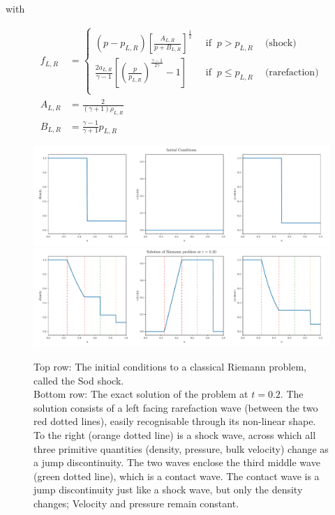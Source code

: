 with 

\begin{align}
	f_{L,R} &= 
		\begin{cases}
			(p - p_{L,R}) \left[ \frac{A_{L,R}}{p + B_{L,R}} \right]^{\frac{1}{2}}
				& ~\text{ if } ~ p > p_{L,R} ~ \quad \text{(shock)} \\
			\frac{2 a_{L,R}}{\gamma - 1} \left[ \left( \frac{p}{p_{L,R}} \right)^ \frac{\gamma -1}{2 \gamma} - 1 \right]
				& ~\text{ if } ~ p \leq p_{L,R} ~ \quad \text{(rarefaction)} \label{eq:riemann-pstar}\\
		\end{cases} \\
	A_{L,R} &= 
		\frac{2}{(\gamma + 1) \rho_{L,R}}\\
	B_{L,R} &= 
		\frac{\gamma - 1}{\gamma + 1} p_{L,R}
\end{align}












\begin{figure}
	\centering
	\includegraphics[width=.9\textwidth]{./figures/riemann_IC.pdf}%
	\\
	\includegraphics[width=.9\textwidth]{./figures/riemann_exact_solution.pdf}%
	\caption{
		Top row: The initial conditions to a classical Riemann problem, called the Sod shock.\\
%
		Bottom row: The exact solution of the problem at $t = 0.2$.
		The solution consists of a left facing rarefaction wave (between the two red dotted lines), easily recognisable through its non-linear shape.
		To the right (orange dotted line) is a shock wave, across which all three primitive quantities (density, pressure, bulk velocity) change as a jump discontinuity.
		The two waves enclose the third middle wave (green dotted line), which is a contact wave.
		The contact wave is a jump discontinuity just like a shock wave, but only the density changes; Velocity and pressure remain constant.
		\label{fig:riemann-solved}
		}%
\end{figure}















